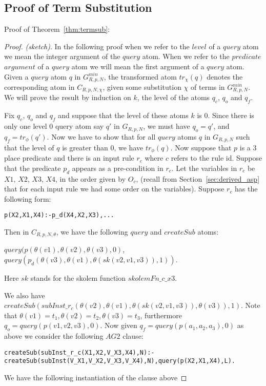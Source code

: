 

\subsection{Proof of Term Substitution}\label{sec:proof_term_substitution}

Proof of Theorem~\ref{thm:termsub}:


\begin{proof} \textit{(sketch)}. In the following proof when we refer to the $level$ of a $query$ atom we mean the integer argument of the $query$ atom. When we refer to the $predicate$ $argument$ of a $query$ atom we will mean the first argument of a $query$ atom. Given a $query$ atom $q$ in $G_{R,p,N}^{min}$, the transformed atom $tr_{\chi}(q)$ denotes the corresponding atom in $C_{R,p,N,\chi}$, given some substitution $\chi$ of terms in $G_{R,p,N}^{min}$. We will prove the result by induction on $k$, the level of the atoms $q_{c}$, $q_{o}$ and $q_{f}$. 

Fix $q_{c}$, $q_{o}$ and $q_{f}$ and suppose that the level of these atoms $k$ is $0$. Since there is only one level $0$ query atom say $q'$ in $G_{R,p,N}$, we must have $q_{o}=q'$, and $q_{f} = tr_{\phi}(q')$. Now we have to show that for all $query$ atoms $q$ in $G_{R,p,N}$ such that the level of $q$ is greater than $0$, we have $tr_{\phi}(q)$. Now suppose that $p$ is a 3 place predicate and there is an input rule $r_{c}$ where ${c}$ refers to the rule id. Suppose that the predicate $p_{d}$ appears as a pre-condition in $r_{c}$. Let the variables in $r_{c}$ be $X1$, $X2$, $X3$, $X4$, in the order given by $O_{c}$, (recall from Section~\ref{sec:derived_asp} that for each input rule we had some order on the variables). Suppose $r_{c}$ has the following form:
\begin{verbatim}
p(X2,X1,X4):-p_d(X4,X2,X3),...    
\end{verbatim}

Then in $C_{R,p,N,\theta}$, we have the following $query$ and $createSub$ atoms:

$query(p(\theta(v1),\theta(v2),\theta(v3),0)$,\\ $query(p_{d}(\theta(v3),\theta(v1),\theta(sk(v2,v1,v3)),1))$. 

Here $sk$ stands for the skolem function $skolemFn\_c\_x3$. 

We also have\\
$createSub(subInst\_r_{c}(\theta(v2),\theta(v1),\theta(sk(v2,v1,v3)), \theta(v3)),1)$. Note that $\theta(v1)=t_{1},\theta(v2)=t_{2},\theta(v3)=t_{3}$, furthermore\\ $q_{o}= query(p(v1,v2,v3),0)$. Now given $q_{f} = query(p(a_{1},a_{2},a_{3}),0)$ as above we consider the following $AG2$ clause:
\begin{lstlisting}[frame=none]
createSub(subInst_r_c(X1,X2,V_X3,X4),N):-
createSub(subInst(V_X1,V_X2,V_X3,V_X4),N),query(p(X2,X1,X4),L).    
\end{lstlisting}
We have the following instantiation of the clause above


\end{proof}
